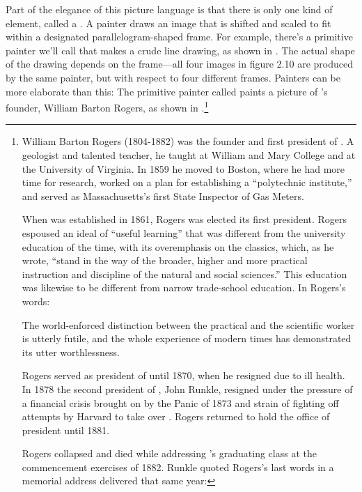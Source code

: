 Part of the elegance of this picture language is that there is only one kind of
element, called a .  A painter draws an image that is shifted
and scaled to fit within a designated parallelogram-shaped frame.  For example,
there's a primitive painter we'll call  that makes a crude line
drawing, as shown in .  The actual shape of the drawing
depends on the frame---all four images in figure 2.10 are produced by the
same  painter, but with respect to four different frames.  Painters
can be more elaborate than this: The primitive painter called 
paints a picture of 's founder, William Barton Rogers, as shown in
.\footnote{%
William Barton Rogers (1804-1882) was the founder
and first president of . A geologist and talented teacher, he
taught at William and Mary College and at the University of Virginia.  In 1859
he moved to Boston, where he had more time for research, worked on a plan for
establishing a ``polytechnic institute,'' and served as Massachusetts's first
State Inspector of Gas Meters.

When  was established in 1861, Rogers was elected its first
president.  Rogers espoused an ideal of ``useful learning'' that was different
from the university education of the time, with its overemphasis on the
classics, which, as he wrote, ``stand in the way of the broader, higher and
more practical instruction and discipline of the natural and social sciences.''
This education was likewise to be different from narrow trade-school education.
In Rogers's words:

\begin{niceQuote}
The world-enforced distinction between the practical and the scientific worker
is utterly futile, and the whole experience of modern times has demonstrated
its utter worthlessness.
\end{niceQuote}

Rogers served as president of  until 1870, when he resigned due to
ill health.  In 1878 the second president of , John Runkle,
resigned under the pressure of a financial crisis brought on by the Panic of
1873 and strain of fighting off attempts by Harvard to take over .
Rogers returned to hold the office of president until 1881.

Rogers collapsed and died while addressing 's graduating class at
the commencement exercises of 1882.  Runkle quoted Rogers's last words in a
memorial address delivered that same year:

}
